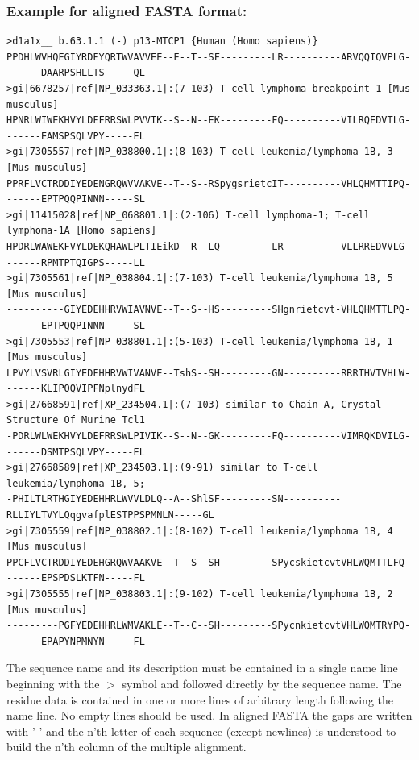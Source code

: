 \documentclass[11pt,a4paper]{article}
\begin{document}
\subsubsection*{Example for aligned FASTA format:}

\scriptsize\begin{verbatim}
>d1a1x__ b.63.1.1 (-) p13-MTCP1 {Human (Homo sapiens)}
PPDHLWVHQEGIYRDEYQRTWVAVVEE--E--T--SF---------LR----------ARVQQIQVPLG-------DAARPSHLLTS-----QL
>gi|6678257|ref|NP_033363.1|:(7-103) T-cell lymphoma breakpoint 1 [Mus musculus]
HPNRLWIWEKHVYLDEFRRSWLPVVIK--S--N--EK---------FQ----------VILRQEDVTLG-------EAMSPSQLVPY-----EL
>gi|7305557|ref|NP_038800.1|:(8-103) T-cell leukemia/lymphoma 1B, 3 [Mus musculus]
PPRFLVCTRDDIYEDENGRQWVVAKVE--T--S--RSpygsrietcIT----------VHLQHMTTIPQ-------EPTPQQPINNN-----SL
>gi|11415028|ref|NP_068801.1|:(2-106) T-cell lymphoma-1; T-cell lymphoma-1A [Homo sapiens]
HPDRLWAWEKFVYLDEKQHAWLPLTIEikD--R--LQ---------LR----------VLLRREDVVLG-------RPMTPTQIGPS-----LL
>gi|7305561|ref|NP_038804.1|:(7-103) T-cell leukemia/lymphoma 1B, 5 [Mus musculus]
----------GIYEDEHHRVWIAVNVE--T--S--HS---------SHgnrietcvt-VHLQHMTTLPQ-------EPTPQQPINNN-----SL
>gi|7305553|ref|NP_038801.1|:(5-103) T-cell leukemia/lymphoma 1B, 1 [Mus musculus]
LPVYLVSVRLGIYEDEHHRVWIVANVE--TshS--SH---------GN----------RRRTHVTVHLW-------KLIPQQVIPFNplnydFL
>gi|27668591|ref|XP_234504.1|:(7-103) similar to Chain A, Crystal Structure Of Murine Tcl1
-PDRLWLWEKHVYLDEFRRSWLPIVIK--S--N--GK---------FQ----------VIMRQKDVILG-------DSMTPSQLVPY-----EL
>gi|27668589|ref|XP_234503.1|:(9-91) similar to T-cell leukemia/lymphoma 1B, 5;
-PHILTLRTHGIYEDEHHRLWVVLDLQ--A--ShlSF---------SN----------RLLIYLTVYLQqgvafplESTPPSPMNLN-----GL
>gi|7305559|ref|NP_038802.1|:(8-102) T-cell leukemia/lymphoma 1B, 4 [Mus musculus] 
PPCFLVCTRDDIYEDEHGRQWVAAKVE--T--S--SH---------SPycskietcvtVHLWQMTTLFQ-------EPSPDSLKTFN-----FL
>gi|7305555|ref|NP_038803.1|:(9-102) T-cell leukemia/lymphoma 1B, 2 [Mus musculus]
---------PGFYEDEHHRLWMVAKLE--T--C--SH---------SPycnkietcvtVHLWQMTRYPQ-------EPAPYNPMNYN-----FL
\end{verbatim}\normalsize

The sequence name and its description must be contained in a single name line beginning 
with the $>$ symbol and followed directly by the sequence name. The residue data is 
contained in one or more lines of arbitrary length following the name line. No empty 
lines should be used. In aligned FASTA the gaps are written with '-' and the n'th 
letter of each sequence (except newlines) is understood to build the n'th column of the 
multiple alignment. 
\end{document}
